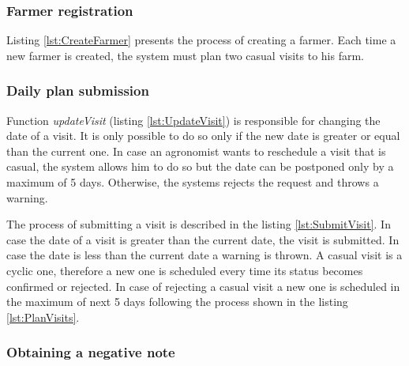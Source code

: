 

\subsubsection*{Farmer registration}

Listing \ref{lst:CreateFarmer} presents the process of creating a farmer. Each time a new farmer is created, the system must plan two casual visits to his farm.



\subsubsection*{Daily plan submission}

Function \textit{updateVisit} (listing \ref{lst:UpdateVisit}) is responsible for changing the date of a visit. It is only possible to do so only if the new date is greater or equal than the current one. In case an agronomist wants to reschedule a visit that is casual, the system allows him to do so but the date can be postponed only by a maximum of 5 days. Otherwise, the systems rejects the request and throws a warning.



The process of submitting a visit is described in the listing \ref{lst:SubmitVisit}. In case the date of a visit is greater than the current date, the visit is submitted. In case the date is less than the current date a warning is thrown. A casual visit is a cyclic one, therefore a new one is scheduled every time its status becomes confirmed or rejected. In case of rejecting a casual visit a new one is scheduled in the maximum of next 5 days following the process shown in the listing \ref{lst:PlanVisits}.



\subsubsection*{Obtaining a negative note}

